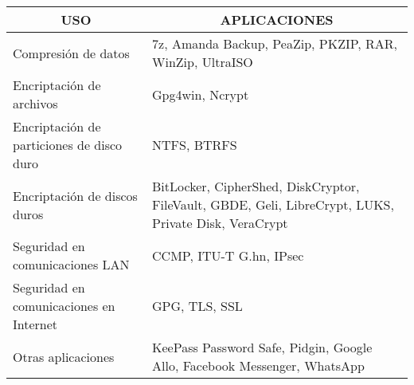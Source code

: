 \begin{tabular}{|p{6cm}|p{8cm}|}
  \hline
  \multicolumn{1}{|c|}{\textbf{USO}} & \multicolumn{1}{c|}{\textbf{APLICACIONES}}       \\ \hline
  Compresión de datos & 7z, Amanda Backup, PeaZip, PKZIP, RAR, WinZip, UltraISO 
  \\ \hline
  Encriptación de archivos & Gpg4win, Ncrypt
  \\ \hline
  Encriptación de particiones de disco duro & NTFS, BTRFS
  \\ \hline
  Encriptación de discos duros & BitLocker, CipherShed, DiskCryptor, FileVault, GBDE, Geli, LibreCrypt, LUKS, Private Disk, VeraCrypt
  \\ \hline
  Seguridad en comunicaciones LAN & CCMP, ITU-T G.hn, IPsec
  \\ \hline
  Seguridad en comunicaciones en Internet & GPG, TLS, SSL
  \\ \hline
  Otras aplicaciones & KeePass Password Safe, Pidgin, Google Allo, Facebook Messenger, WhatsApp
  \\ \hline
\end{tabular}
